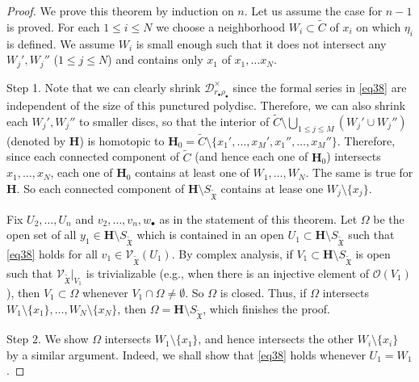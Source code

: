 \documentclass[12pt,a4paper,notitlepage]{article}
\theoremstyle{definition}
\theoremstyle{plain}
\newcommand{\fk}{\mathfrak}
\newcommand{\mc}{\mathcal}
\newcommand{\wtd}{\widetilde}
\newcommand{\scr}{\mathscr}
\newcommand{\mbf}{\mathbf}
\newcommand{\blt}{\bullet}
\newcommand{\SXtd}{S_{\wtd{\fk X}}}
\numberwithin{equation}{section}
\begin{document}
\begin{proof}
We prove this theorem by induction on $n$. Let us assume the case for  $n-1$ is proved. For each $1\leq i\leq N$ we choose a neighborhood $W_i\subset\wtd C$ of $x_i$ on which $\eta_i$ is defined. We assume $W_i$ is small enough such that it does not intersect any $W_j',W_j''$ ($1\leq j\leq N$) and contains only $x_1$ of $x_1,\dots x_N$.	







Step 1.  Note that we can clearly shrink $\mc D_{r_\blt\rho_\blt}^\times$ since the formal series in \eqref{eq38} are independent of the size of this punctured polydisc. Therefore, we can also shrink each $W_j',W_j''$ to smaller discs, so that the interior of $\wtd C\setminus\bigcup_{1\leq j\leq M}(W_j'\cup W_j'')$ (denoted by $\mbf H$) is homotopic to $\mbf H_0=\wtd C\setminus\{x_1',\dots,x_M',x_1'',\dots,x_M''\}$. Therefore, since each connected component of $\wtd C$ (and hence each one of $\mbf H_0$) intersects $x_1,\dots,x_N$, each one of $\mbf H_0$ contains at least one of $W_1,\dots,W_N$. The same is true for $\mbf H$. So each connected component of $\mbf H\setminus\SXtd$ contains at lease one $W_j\setminus\{x_j\}$.

Fix $U_2,\dots,U_n$ and $v_2,\dots,v_n,w_\blt$ as in the statement of this theorem. Let $\Omega$ be the open set of all $y_1\in\mbf H\setminus\SXtd$ which is contained in an open $U_1\subset\mbf H\setminus\SXtd$ such that  \eqref{eq38} holds for all $v_1\in\scr V_{\wtd{\fk X}}(U_1)$. By complex analysis, if $V_1\subset\mbf H\setminus\SXtd$ is open such that $\scr V_{\wtd{\fk X}}|_{V_1}$ is trivializable (e.g., when there is an injective element of $\scr O(V_1)$), then $V_1\subset\Omega$ whenever $V_1\cap \Omega\neq\emptyset$. So $\Omega$ is closed. Thus, if $\Omega$ intersects $W_1\setminus\{x_1\},\dots,W_N\setminus\{x_N\}$, then $\Omega=\mbf H\setminus\SXtd$, which finishes the proof.

Step 2. We show $\Omega$ intersects $W_1\setminus\{x_1\}$, and hence intersects the other $W_i\setminus\{x_i\}$ by a similar argument. Indeed, we shall show that \eqref{eq38} holds whenever $U_1=W_1$. 



\end{proof}
\end{document}
